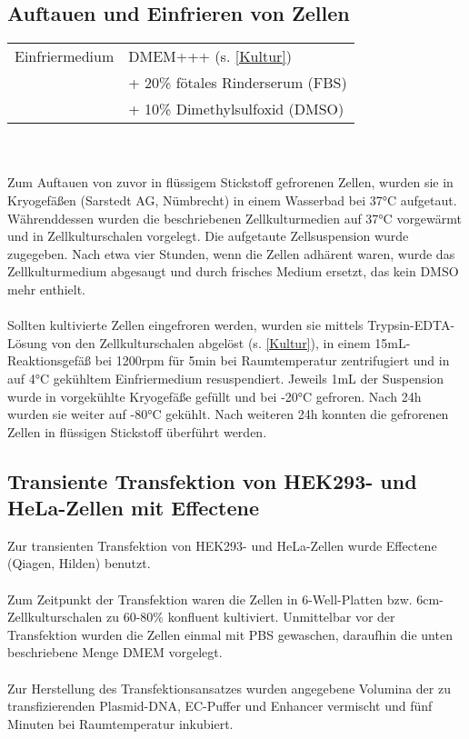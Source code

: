 \subsection{Auftauen und Einfrieren von Zellen}
\begin{tabularx}{\textwidth}{ll}
	Einfriermedium 	& DMEM+++ (s. \ref{Kultur})			\\
					& + 20\% fötales Rinderserum (FBS)	\\
					& + 10\% Dimethylsulfoxid (DMSO)		\\
\end{tabularx}
\\ \\
Zum Auftauen von zuvor in flüssigem Stickstoff gefrorenen Zellen, wurden sie in Kryogefäßen (Sarstedt AG, Nümbrecht) in einem Wasserbad bei 37\si{\celsius} aufgetaut. Währenddessen wurden die beschriebenen Zellkulturmedien auf 37\si{\celsius} vorgewärmt und in Zellkulturschalen vorgelegt. Die aufgetaute Zellsuspension wurde zugegeben. Nach etwa vier Stunden, wenn die Zellen adhärent waren, wurde das Zellkulturmedium abgesaugt und durch frisches Medium ersetzt, das kein DMSO mehr enthielt.
\\
\\
Sollten kultivierte Zellen eingefroren werden, wurden sie mittels Trypsin-EDTA-Lösung von den Zellkulturschalen abgelöst (s. \ref{Kultur}), in einem 15\si{\milli\liter}-Reaktionsgefäß bei 1200\si{rpm} für 5\si{\minute} bei Raumtemperatur zentrifugiert und in auf 4\si{\celsius} gekühltem Einfriermedium resuspendiert. Jeweils 1\si{\milli\liter} der Suspension wurde in vorgekühlte Kryogefäße gefüllt und bei -20\si{\celsius} gefroren. Nach 24\si{\hour} wurden sie weiter auf -80\si{\celsius} gekühlt. Nach weiteren 24\si{\hour} konnten die gefrorenen Zellen in flüssigen Stickstoff überführt werden.

\subsection{Transiente Transfektion von HEK293- und HeLa-Zellen mit Effectene} \label{transfektion}
Zur transienten Transfektion von HEK293- und HeLa-Zellen wurde Effectene (Qiagen, Hilden) benutzt. 
\\
\\
Zum Zeitpunkt der Transfektion waren die Zellen in 6-Well-Platten bzw. 6\si{\centi\meter}-Zellkulturschalen zu 60-80\% konfluent kultiviert. Unmittelbar vor der Transfektion wurden die Zellen einmal mit PBS gewaschen, daraufhin die unten beschriebene Menge DMEM vorgelegt.
\\
\\
Zur Herstellung des Transfektionsansatzes wurden angegebene Volumina der zu transfizierenden Plasmid-DNA, EC-Puffer und Enhancer vermischt und fünf Minuten bei Raumtemperatur inkubiert.

